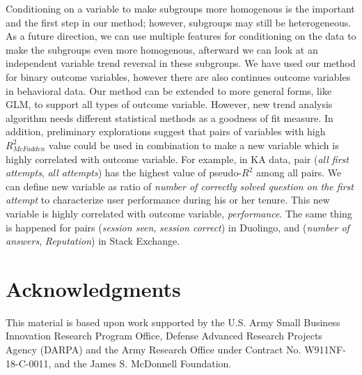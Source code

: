 \documentclass[letterpaper]{article} %
\begin{document}
Conditioning on a variable to make subgroups more homogenous is the important and the first step in our method; however, subgroups may still be heterogeneous. As a future direction, we can use multiple features for conditioning on the data to make the subgroups even more homogenous, afterward we can look at an independent variable trend reversal in these subgroups.
We have used our method for binary outcome variables, however there are also continues outcome variables in behavioral data. Our method can be extended to more general forms, like GLM, to support all types of outcome variable. However, new trend analysis algorithm needs different statistical methods as a goodness of fit measure.
In addition, preliminary explorations suggest that pairs of variables with high $R^2_{McFadden}$ value could be used in combination to make a new variable which is highly correlated with outcome variable. For example, in KA data, pair (\emph{all first attempts}, \emph{all attempts}) has the highest value of pseudo-$R^2$ among all pairs. We can define new variable as ratio of \emph{number of correctly solved question on the first attempt} to characterize user performance during his or her tenure. This new variable is highly correlated with outcome variable, \emph{performance}. The same thing is happened for pairs
(\emph{session seen}, \emph{session correct}) in Duolingo, and (\emph{number of answers}, \emph{Reputation}) in Stack Exchange.



\section{Acknowledgments}
This material is based upon work supported by the U.S. Army Small Business Innovation Research Program Office, Defense Advanced Research Projects Agency (DARPA) and the Army Research Office under Contract No. W911NF-18-C-0011, and the James S. McDonnell Foundation.
\end{document}

